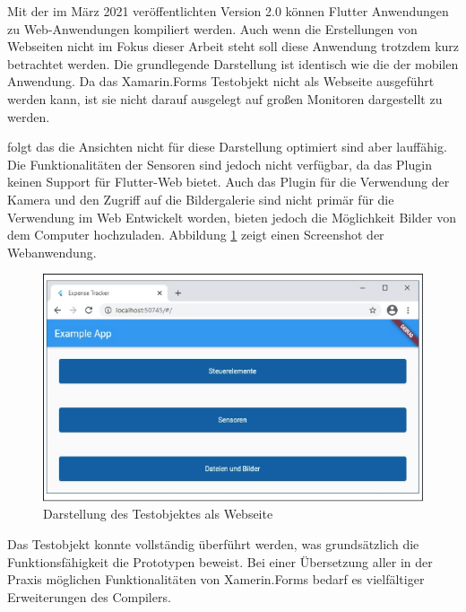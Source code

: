 Mit der im März 2021 veröffentlichten Version 2.0  können Flutter Anwendungen zu Web-Anwendungen kompiliert werden.  Auch wenn die Erstellungen von Webseiten nicht im Fokus dieser Arbeit steht soll diese Anwendung trotzdem kurz betrachtet werden.  Die grundlegende Darstellung ist identisch wie die der mobilen Anwendung.  Da das Xamarin.Forms Testobjekt nicht als Webseite ausgeführt werden kann,  ist sie nicht darauf ausgelegt auf großen Monitoren dargestellt zu werden.   

 folgt das die Ansichten nicht für diese Darstellung optimiert sind aber lauffähig.  Die Funktionalitäten der Sensoren sind jedoch nicht verfügbar, da das Plugin keinen Support für Flutter-Web bietet.  Auch das Plugin für die Verwendung der Kamera und den Zugriff auf die Bildergalerie sind nicht primär für die Verwendung im Web Entwickelt worden,  bieten jedoch die Möglichkeit Bilder von dem Computer hochzuladen.  Abbildung \ref{fig:WebView} zeigt einen Screenshot der Webanwendung.

\begin{figure}[!ht]
 \includegraphics[width=\textwidth,keepaspectratio]{Images/Implementation/WebApp.png}
 \caption{Darstellung des Testobjektes als Webseite}
 \label{fig:WebView}
\end{figure}


Das Testobjekt konnte vollständig überführt werden, was grundsätzlich die 
Funktionsfähigkeit die Prototypen beweist. Bei einer Übersetzung aller in der Praxis möglichen 
Funktionalitäten von Xamerin.Forms bedarf es vielfältiger Erweiterungen des Compilers.


